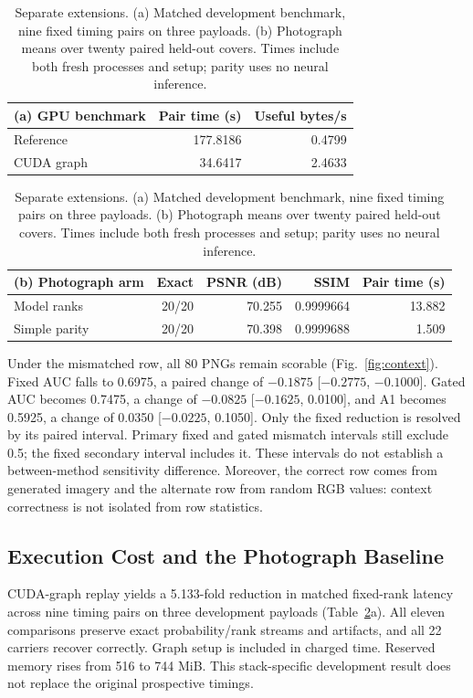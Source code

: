 \documentclass[orivec]{llncs}
\begin{document}
\begin{table}[t]
\caption{Separate extensions. (a) Matched development benchmark, nine fixed timing pairs on three payloads. (b) Photograph means over twenty paired held-out covers. Times include both fresh processes and setup; parity uses no neural inference.}
\label{tab:photo}\centering
\begin{tabular}{lrr}
\toprule
(a) GPU benchmark & Pair time (s) & Useful bytes/s\\
\midrule
Reference & 177.8186 & 0.4799\\
CUDA graph & 34.6417 & 2.4633\\
\bottomrule
\end{tabular}

\begin{tabular}{lrrrr}
\toprule
(b) Photograph arm & Exact & PSNR (dB) & SSIM & Pair time (s)\\
\midrule
Model ranks & 20/20 & 70.255 & 0.9999664 & 13.882\\
Simple parity & 20/20 & 70.398 & 0.9999688 & 1.509\\
\bottomrule
\end{tabular}
\end{table}

Under the mismatched row, all 80 PNGs remain scorable (Fig.~\ref{fig:context}). Fixed AUC falls to 0.6975, a paired change of $-0.1875$ [$-0.2775$, $-0.1000$]. Gated AUC becomes 0.7475, a change of $-0.0825$ [$-0.1625$, 0.0100], and A1 becomes 0.5925, a change of 0.0350 [$-0.0225$, 0.1050]. Only the fixed reduction is resolved by its paired interval. Primary fixed and gated mismatch intervals still exclude 0.5; the fixed secondary interval includes it. These intervals do not establish a between-method sensitivity difference. Moreover, the correct row comes from generated imagery and the alternate row from random RGB values: context correctness is not isolated from row statistics.

\subsection{Execution Cost and the Photograph Baseline}
CUDA-graph replay yields a 5.133-fold reduction in matched fixed-rank latency across nine timing pairs on three development payloads (Table~\ref{tab:photo}a). All eleven comparisons preserve exact probability/rank streams and artifacts, and all 22 carriers recover correctly. Graph setup is included in charged time. Reserved memory rises from 516 to 744 MiB. This stack-specific development result does not replace the original prospective timings.
\end{document}
